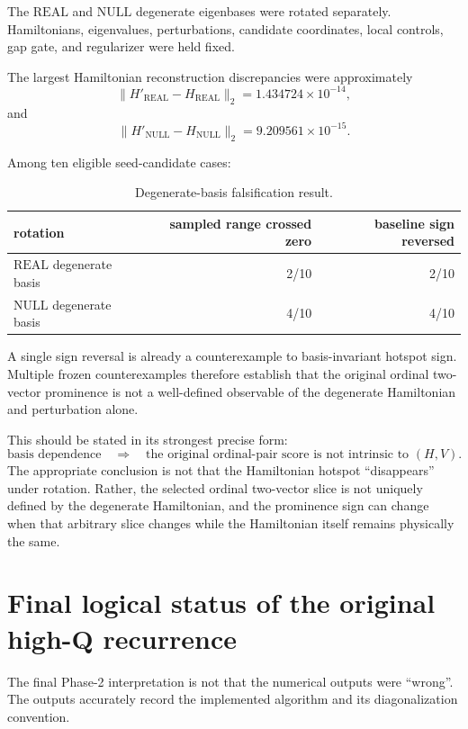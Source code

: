 \documentclass[11pt,a4paper]{article}
\newcommand{\Real}{\mathrm{REAL}}
\newcommand{\Null}{\mathrm{NULL}}
\begin{document}
The \(\Real\) and \(\Null\) degenerate eigenbases were rotated separately.
Hamiltonians, eigenvalues, perturbations, candidate coordinates, local
controls, gap gate, and regularizer were held fixed.

The largest Hamiltonian reconstruction discrepancies were approximately
\[
\|H'_{\Real}-H_{\Real}\|_2
=
1.434724\times10^{-14},
\]
and
\[
\|H'_{\Null}-H_{\Null}\|_2
=
9.209561\times10^{-15}.
\]

Among ten eligible seed-candidate cases:

\begin{table}[H]
\centering
\caption{Degenerate-basis falsification result.}
\begin{tabular}{@{}lrr@{}}
\toprule
rotation & sampled range crossed zero & baseline sign reversed\\
\midrule
\(\Real\) degenerate basis & 2/10 & 2/10\\
\(\Null\) degenerate basis & 4/10 & 4/10\\
\bottomrule
\end{tabular}
\end{table}

A single sign reversal is already a counterexample to basis-invariant hotspot
sign.  Multiple frozen counterexamples therefore establish that the original
ordinal two-vector prominence is not a well-defined observable of the
degenerate Hamiltonian and perturbation alone.


This should be stated in its strongest precise form:
\[
\boxed{
\text{basis dependence}
\quad\Longrightarrow\quad
\text{the original ordinal-pair score is not intrinsic to }(H,V).
}
\]
The appropriate conclusion is not that the Hamiltonian hotspot
``disappears'' under rotation.  Rather, the selected ordinal two-vector slice
is not uniquely defined by the degenerate Hamiltonian, and the prominence sign
can change when that arbitrary slice changes while the Hamiltonian itself
remains physically the same.

\section{Final logical status of the original high-Q recurrence}

The final Phase-2 interpretation is not that the numerical outputs were
``wrong''.  The outputs accurately record the implemented algorithm and its
diagonalization convention.
\end{document}
